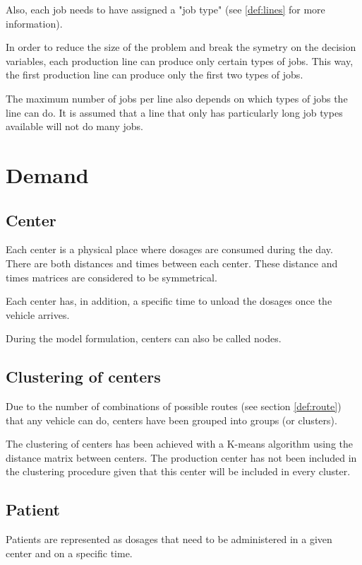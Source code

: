 Also, each job needs to have assigned a "job type" (see \ref{def:lines} for more information).

In order to reduce the size of the problem and break the symetry on the decision variables, each production line can produce only certain types of jobs. This way, the first production line can produce only the first two types of jobs.

The maximum number of jobs per line also depends on which types of jobs the line can do. It is assumed that a line that only has particularly long job types available will not do many jobs.

\section{Demand}

\subsection{Center}

Each center is a physical place where dosages are consumed during the day. There are both distances and times between each center. These distance and times matrices are considered to be symmetrical.

Each center has, in addition, a specific time to unload the dosages once the vehicle arrives.

During the model formulation, centers can also be called nodes.

\subsection{Clustering of centers}
\label{def:cluster}

Due to the number of combinations of possible routes (see section \ref{def:route}) that any vehicle can do, centers have been grouped into groups (or clusters).

The clustering of centers has been achieved with a K-means algorithm using the distance matrix between centers. The production center has not been included in the clustering procedure given that this center will be included in every cluster.

\subsection{Patient}

Patients are represented as dosages that need to be administered in a given center and on a specific time.


